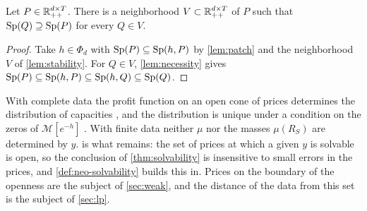 \begin{corollary}[openness]\label{lem:open}
Let $P\in\Rpp[d\times T]$. There is a neighborhood $V\subset\Rpp[d\times T]$ of $P$ such that $\Sp(Q)\supseteq\Sp(P)$ for every $Q\in V$.
\end{corollary}

\begin{proof}
Take $h\in\Phi_d$ with $\Sp(P)\subseteq\Sp(h,P)$ by \cref{lem:patch} and the neighborhood $V$ of \cref{lem:stability}. For $Q\in V$, \cref{lem:necessity} gives $\Sp(P)\subseteq\Sp(h,P)\subseteq\Sp(h,Q)\subseteq\Sp(Q)$.
\end{proof}

\begin{remark}
With complete data the profit function on an open cone of prices determines the distribution of capacities \citep[Thm.~2.1]{AgaltsovMolchanovShananin2018}, and the distribution is unique under a condition on the zeros of $\mathcal M[e^{-h}]$ \citep{Agaltsov2016}. With finite data neither $\mu$ nor the masses $\mu(R_S)$ are determined by $y$.  is what remains: the set of prices at which a given $y$ is solvable is open, so the conclusion of \cref{thm:solvability} is insensitive to small errors in the prices, and \cref{def:neo-solvability} builds this in. Prices on the boundary of the openness are the subject of \cref{sec:weak}, and the distance of the data from this set is the subject of \cref{sec:lp}.
\end{remark}

